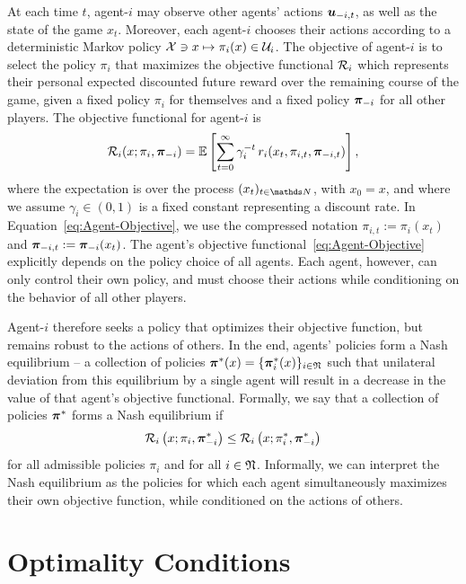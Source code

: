 \documentclass[onefignum,onetabnum]{siamonline171218}
\begin{document}
At each time $t$, agent-$i$ may observe other agents' actions ${\bm{u}}_{-i,t}$, as well as the state of the game $x_t$. Moreover, each agent-$i$ chooses their actions according to a deterministic Markov policy $ \mathcal{X} \ni x \mapsto \pi_i(x) \in \mathcal{U}_i$. The objective of agent-$i$ is to select the  policy $\pi_i$ that maximizes the objective functional $\mathcal{R}_i$ which represents their personal expected discounted future reward over the remaining course of the game, given a fixed policy $\pi_i$ for themselves and a fixed policy $\bm{\pi}_{-i}$ for all other players. The objective functional for agent-$i$ is
\begin{equation} \label{eq:Agent-Objective}
	\Ri(x;\pi_i,\bpi_{-i}) =
	\E\left[ \sum_{t=0}^\infty \gamma_i^{-t} \, r_{i}(x_t,\pi_{i,t},\bpi_{-i,t}) \right],
\end{equation}
where the expectation is over the process $(x_t)_{t\in\NN}$, with $x_0=x$, and where we assume $\gamma_i \in (0,1)$ is a fixed constant representing a discount rate. In Equation~\eqref{eq:Agent-Objective}, we use the compressed notation $\pi_{i,t} := \pi_i(x_t)$ and $\bm{\pi}_{-i,t} := \bm{\pi}_{-i}(x_t)$.  The agent's objective functional~\eqref{eq:Agent-Objective} explicitly depends on the policy choice of all agents. Each agent, however, can only control their own policy, and must choose their actions while conditioning on the behavior of all other players.

Agent-$i$ therefore seeks a policy that optimizes their objective function, but remains robust to the actions of others. In the end, agents' policies form a Nash equilibrium -- a collection of policies $\bm{\pi}^{\ast}(x) = \{ \bm{\pi}^{\ast}_i(x) \}_{i\in{\mathfrak{N}}}$ such that unilateral deviation from this equilibrium by a single agent will result in a decrease in the value of that agent's  objective functional. Formally, we say that a collection of policies $\bm{\pi}^{\ast}$ forms a Nash equilibrium if \begin{equation} \label{eq:Nash-equilibrium-def}
	\Ri\left( x ; \pi_i , \bpist_{-i} \right)
	\leq
	\Ri\left( x ; \pist_i , \bpist_{-i} \right)
\end{equation}
for all admissible policies $\pi_i$ and for all $i\in{\mathfrak{N}}$.
Informally, we can interpret the Nash equilibrium as the policies for which each agent simultaneously maximizes their own objective function, while conditioned on the actions of others.

\section{Optimality Conditions}
\label{sec:Optimality-Conditions}
\end{document}
